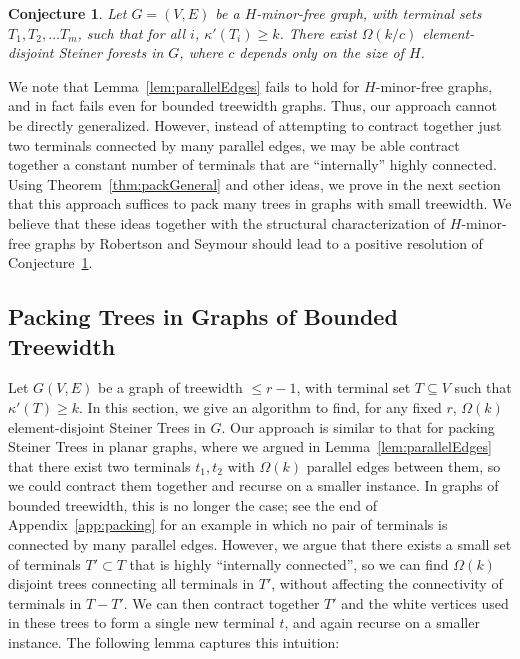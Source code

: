 \documentclass[11pt]{article}
\newtheorem{conjecture}{Conjecture}
\newcommand{\elconn}{\kappa'}
\begin{document}
\begin{conjecture}
  \label{conj:minorfree}
  Let $G=(V,E)$ be a $H$-minor-free graph, with terminal sets $T_1,
  T_2, \ldots T_m$, such that for all $i$, $\elconn(T_i) \ge k$.
  There exist $\Omega(k/c)$ element-disjoint Steiner forests in $G$,
  where $c$ depends only on the size of $H$.
\end{conjecture}

We note that Lemma~\ref{lem:parallelEdges} fails to hold for
$H$-minor-free graphs, and in fact fails even for bounded treewidth
graphs. Thus, our approach cannot be directly generalized. However,
instead of attempting to contract together just two terminals
connected by many parallel edges, we may be able contract together a
constant number of terminals that are ``internally'' highly
connected. Using Theorem~\ref{thm:packGeneral} and other ideas, we
prove in the next section that this approach suffices to pack many
trees in graphs with small treewidth. We believe that these ideas
together with the structural characterization of $H$-minor-free graphs
by Robertson and Seymour \cite{RobertsonSeymour} should lead to a
positive resolution of Conjecture~\ref{conj:minorfree}.


\subsection{Packing Trees in Graphs of Bounded Treewidth}
\label{subsec:treewidth}

Let $G(V,E)$ be a graph of treewidth $\le r-1$, with terminal set $T
\subseteq V$ such that $\elconn(T) \ge k$. In this section, we give an
algorithm to find, for any fixed $r$, $\Omega(k)$ element-disjoint
Steiner Trees in $G$. Our approach is similar to that for packing
Steiner Trees in planar graphs, where we argued in
Lemma~\ref{lem:parallelEdges} that there exist two terminals $t_1,
t_2$ with $\Omega(k)$ parallel edges between them, so we could
contract them together and recurse on a smaller instance. In graphs of
bounded treewidth, this is no longer the case; see the end of
Appendix~\ref{app:packing} for an example in which no pair of
terminals is connected by many parallel edges.  However, we argue that
there exists a small set of terminals $T' \subset T$ that is highly
``internally connected'', so we can find $\Omega(k)$ disjoint trees
connecting all terminals in $T'$, without affecting the connectivity
of terminals in $T - T'$. We can then contract together $T'$ and the
white vertices used in these trees to form a single new terminal $t$,
and again recurse on a smaller instance. The following lemma captures
this intuition:
\end{document}
